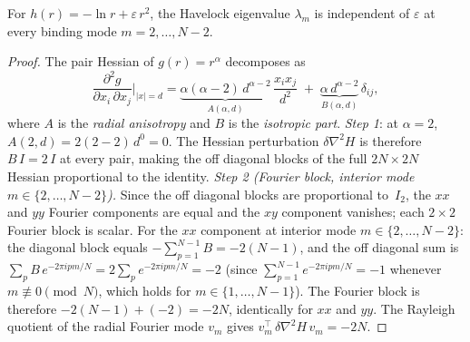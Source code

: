 \begin{proposition}[Isotropic marginality at $\alpha = 2$]
\label{prop:alpha-2-marginal}
For $h(r) = -\ln r + \varepsilon\,r^2$, the Havelock eigenvalue
$\lambda_m$ is independent of $\varepsilon$ at every binding mode
$m = 2, \ldots, N{-}2$.
\end{proposition}

\begin{proof}
The pair Hessian of $g(r) = r^\alpha$ decomposes as
\begin{equation}\label{eq:anisotropy}
  \frac{\partial^2 g}{\partial x_i\,\partial x_j}\bigg|_{|x|=d}
  = \underbrace{\alpha(\alpha{-}2)\,d^{\alpha-2}}_{\displaystyle A(\alpha,d)}\,
  \frac{x_i x_j}{d^2}
  \;+\;
  \underbrace{\alpha\,d^{\alpha-2}}_{\displaystyle B(\alpha,d)}\,
  \delta_{ij},
\end{equation}
where $A$ is the \emph{radial anisotropy} and $B$ is the
\emph{isotropic part}.
\emph{Step 1}: at $\alpha = 2$, $A(2,d) = 2(2{-}2)\,d^0 = 0$.
The Hessian perturbation $\delta\nabla^2 H$ is therefore
$B\,I = 2\,I$ at every pair, making the off diagonal blocks
of the full $2N\times 2N$ Hessian proportional to the identity.
\emph{Step 2 (Fourier block, interior mode $m \in \{2,\ldots,N{-}2\}$).}
Since the off diagonal blocks are proportional to~$I_2$, the
$xx$ and $yy$ Fourier components are equal and the $xy$ component
vanishes; each $2 \times 2$ Fourier block is scalar.
For the $xx$ component at interior mode
$m \in \{2, \ldots, N{-}2\}$: the diagonal block
equals $-\sum_{p=1}^{N-1} B = -2(N{-}1)$, and the off diagonal
sum is $\sum_p B\,e^{-2\pi i pm/N} = 2\sum_p e^{-2\pi i pm/N} = -2$
(since $\sum_{p=1}^{N-1} e^{-2\pi i pm/N} = -1$ whenever
$m \not\equiv 0 \pmod N$, which holds for $m \in \{1,\ldots,N{-}1\}$).
The Fourier block is therefore $-2(N{-}1) + (-2) = -2N$,
identically for $xx$ and $yy$.  The Rayleigh quotient of the
radial Fourier mode $v_m$ gives
$v_m^\top\,\delta\nabla^2\!H\,v_m = -2N$.


\end{proof}
